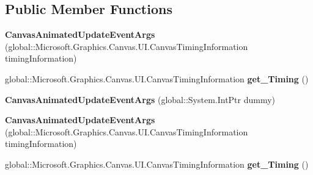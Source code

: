 \subsection*{Public Member Functions}
\begin{DoxyCompactItemize}
\item 
\mbox{\label{class_microsoft_1_1_graphics_1_1_canvas_1_1_u_i_1_1_xaml_1_1_canvas_animated_update_event_args_a33ac1d9a90ed5bc74dc911125a125018}} 
{\bfseries Canvas\+Animated\+Update\+Event\+Args} (global\+::\+Microsoft.\+Graphics.\+Canvas.\+U\+I.\+Canvas\+Timing\+Information timing\+Information)
\item 
\mbox{\label{class_microsoft_1_1_graphics_1_1_canvas_1_1_u_i_1_1_xaml_1_1_canvas_animated_update_event_args_a3386f26482966231d3a4199aaa540918}} 
global\+::\+Microsoft.\+Graphics.\+Canvas.\+U\+I.\+Canvas\+Timing\+Information {\bfseries get\+\_\+\+Timing} ()
\item 
\mbox{\label{class_microsoft_1_1_graphics_1_1_canvas_1_1_u_i_1_1_xaml_1_1_canvas_animated_update_event_args_a022ce809a253b735d009ef6a5823ad36}} 
{\bfseries Canvas\+Animated\+Update\+Event\+Args} (global\+::\+System.\+Int\+Ptr dummy)
\item 
\mbox{\label{class_microsoft_1_1_graphics_1_1_canvas_1_1_u_i_1_1_xaml_1_1_canvas_animated_update_event_args_a33ac1d9a90ed5bc74dc911125a125018}} 
{\bfseries Canvas\+Animated\+Update\+Event\+Args} (global\+::\+Microsoft.\+Graphics.\+Canvas.\+U\+I.\+Canvas\+Timing\+Information timing\+Information)
\item 
\mbox{\label{class_microsoft_1_1_graphics_1_1_canvas_1_1_u_i_1_1_xaml_1_1_canvas_animated_update_event_args_a3386f26482966231d3a4199aaa540918}} 
global\+::\+Microsoft.\+Graphics.\+Canvas.\+U\+I.\+Canvas\+Timing\+Information {\bfseries get\+\_\+\+Timing} ()
\item 
\mbox{\label{class_microsoft_1_1_graphics_1_1_canvas_1_1_u_i_1_1_xaml_1_1_canvas_animated_update_event_args_a022ce809a253b735d009ef6a5823ad36}} 

\end{DoxyCompactItemize}
